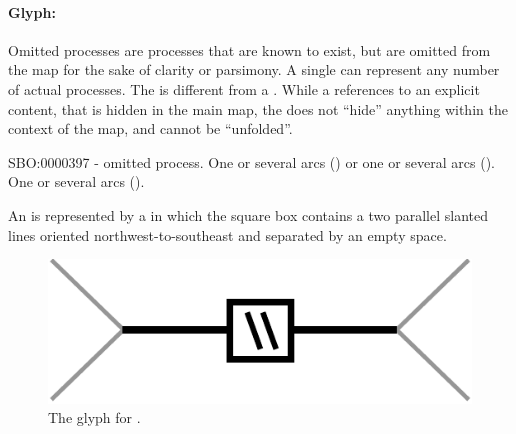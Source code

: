 \paragraph{Glyph: }\label{sec:omitted}

Omitted processes are processes that are known to exist, but are omitted from the map for the sake of clarity or parsimony. A single  can represent any number of actual processes. The  is different from a . While a  references to an explicit content, that is hidden in the main map, the  does not ``hide'' anything within the context of the map, and cannot be ``unfolded''.

\begin{glyphDescription}
 \glyphSboTerm SBO:0000397 - omitted process.
 \glyphOrigin One or several  arcs () or one or several  arcs ().
 \glyphTarget One or several  arcs ().

 \glyphNode An  is represented by a  in which the square box contains a two parallel slanted lines oriented northwest-to-southeast and separated by an empty space.
 \end{glyphDescription}

\begin{figure}[H]
  \centering
  \includegraphics[scale = 0.5]{images/omitted}
  \caption{The \PD glyph for .}
  \label{fig:omitted}
\end{figure}




